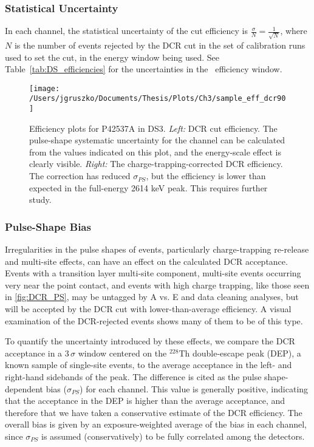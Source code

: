 \subsubsection{Statistical Uncertainty}
In each channel, the statistical uncertainty of the cut efficiency is $\frac{\sigma}{N} = \frac{1}{\sqrt{N}}$, where $N$ is the number of events rejected by the DCR cut in the set of calibration runs used to set the cut, in the energy window being used. See Table~\ref{tab:DS_efficiencies} for the uncertainties in the \nonubb\ efficiency window.

\begin{figure*}[t]
 \centering
 \texttt{[image: /Users/jgruszko/Documents/Thesis/Plots/Ch3/sample\_eff\_dcr90]}
 \caption[DCR cut efficiency and uncertainties]{Efficiency plots for P42537A in DS3. {\it Left:} DCR cut efficiency. The pulse-shape systematic uncertainty for the channel can be calculated from the values indicated on this plot, and the energy-scale effect is clearly visible. {\it Right:} The charge-trapping-corrected DCR efficiency. The correction has reduced $\sigma_{PS}$, but the efficiency is lower than expected in the full-energy 2614 keV peak. This requires further study.} 
 \label{fig:singleCh_eff}
\end{figure*}

\subsubsection{Pulse-Shape Bias}
Irregularities in the pulse shapes of events, particularly charge-trapping re-release and multi-site effects, can have an effect on the calculated DCR acceptance. Events with a transition layer multi-site component, multi-site events occurring very near the point contact, and events with high charge trapping, like those seen in \ref{fig:DCR_PS}, may be untagged by A vs. E and data cleaning analyses, but will be accepted by the DCR cut with lower-than-average efficiency. A visual examination of the DCR-rejected events shows many of them to be of this type.

To quantify the uncertainty introduced by these effects, we compare the DCR acceptance in a 3\,$\sigma$ window centered on the $^{228}$Th double-escape peak (DEP), a known sample of single-site events, to the average acceptance in the left- and right-hand sidebands of the peak. The difference is cited as the pulse shape-dependent bias ($\sigma_{PS}$) for each channel. This value is generally positive, indicating that the acceptance in the DEP is higher than the average acceptance, and therefore that we have taken a conservative estimate of the DCR efficiency. The overall bias is given by an exposure-weighted average of the bias in each channel, since $\sigma_{PS}$ is assumed (conservatively) to be fully correlated among the detectors. 

